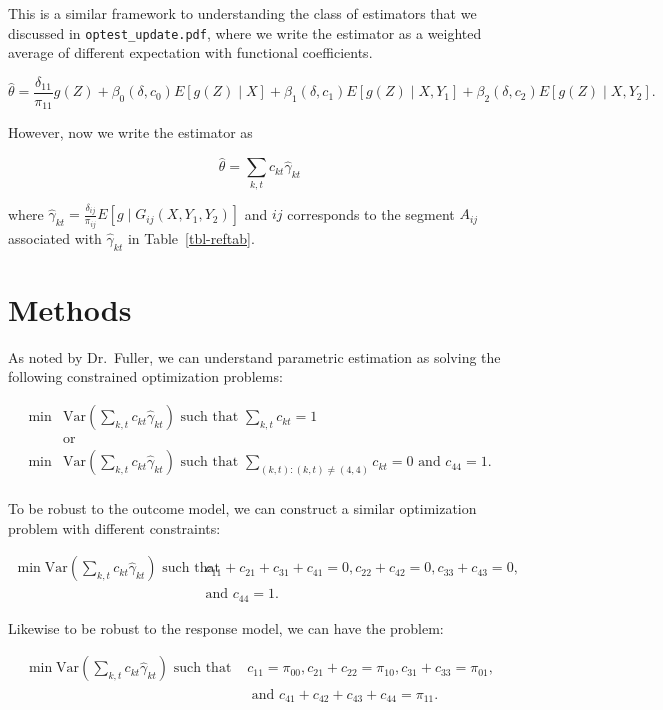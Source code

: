 \documentclass[
  letterpaper,
  DIV=11,
  numbers=noendperiod]{scrartcl}
\newcommand{\Var}{{\text{Var}}}
\begin{document}
This is a similar framework to understanding the class of estimators
that we discussed in \verb|optest_update.pdf|, where we write the
estimator as a weighted average of different expectation with functional
coefficients.

\[\hat \theta = \frac{\delta_{11}}{\pi_{11}}g(Z) + \beta_0(\delta, c_0)E[g(Z)
\mid X] + \beta_1(\delta, c_1)E[g(Z) \mid X, Y_1] + \beta_2(\delta, c_2) E[g(Z)
\mid X, Y_2].\]

However, now we write the estimator as

\[\hat \theta = \sum_{k,t} c_{kt}\hat \gamma_{kt}\]

where
\(\hat \gamma_{kt} = \frac{\delta_{ij}}{\pi_{ij}}E[g \mid G_{ij}(X, Y_1, Y_2)]\)
and \(ij\) corresponds to the segment \(A_{ij}\) associated with
\(\hat \gamma_{kt}\) in Table~\ref{tbl-reftab}.

\hypertarget{sec-methods}{%
\section{Methods}\label{sec-methods}}

As noted by Dr.~Fuller, we can understand parametric estimation as
solving the following constrained optimization problems:

\begin{align*}
  \min &\Var\left(\sum_{k, t} c_{kt} \hat \gamma_{kt}\right) \text{ such that } 
  \sum_{k,t} c_{kt} = 1 \\
       &\text{or} \\
  \min &\Var\left(\sum_{k, t} c_{kt} \hat \gamma_{kt}\right) \text{ such that } 
  \sum_{(k,t): (k,t) \neq (4, 4)} c_{kt} = 0 \text{ and } c_{44} = 1. \\
\end{align*}

To be robust to the outcome model, we can construct a similar
optimization problem with different constraints:

\begin{align*}
  \min \Var\left(\sum_{k, t} c_{kt} \hat \gamma_{kt}\right) \text{ such that }& 
  c_{11} + c_{21} + c_{31} + c_{41} = 0, c_{22} + c_{42} = 0, c_{33} + c_{43} = 0,\\
       &\text{and } c_{44} = 1.
\end{align*}

Likewise to be robust to the response model, we can have the problem:

\begin{align*}
  \min \Var\left(\sum_{k, t} c_{kt} \hat \gamma_{kt}\right) \text{ such that }& 
  c_{11} = \pi_{00}, c_{21} + c_{22} = \pi_{10}, c_{31} + c_{33} = \pi_{01}, \\
       &\text{ and } c_{41} + c_{42} + c_{43} + c_{44} = \pi_{11}.
\end{align*}
\end{document}
